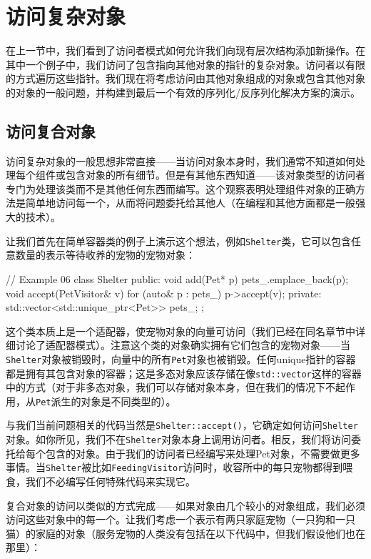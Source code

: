 \section{访问复杂对象}

在上一节中，我们看到了访问者模式如何允许我们向现有层次结构添加新操作。在其中一个例子中，我们访问了包含指向其他对象的指针的复杂对象。访问者以有限的方式遍历这些指针。我们现在将考虑访问由其他对象组成的对象或包含其他对象的对象的一般问题，并构建到最后一个有效的序列化/反序列化解决方案的演示。

\subsection{访问复合对象}

访问复杂对象的一般思想非常直接——当访问对象本身时，我们通常不知道如何处理每个组件或包含对象的所有细节。但是有其他东西知道——该对象类型的访问者专门为处理该类而不是其他任何东西而编写。这个观察表明处理组件对象的正确方法是简单地访问每一个，从而将问题委托给其他人（在编程和其他方面都是一般强大的技术）。

让我们首先在简单容器类的例子上演示这个想法，例如\texttt{Shelter}类，它可以包含任意数量的表示等待收养的宠物的宠物对象：

\begin{code}
// Example 06
class Shelter {
  public:
  void add(Pet* p) {
    pets_.emplace_back(p);
  }
  void accept(PetVisitor& v) {
    for (auto& p : pets_) {
      p->accept(v);
    }
  }
  private:
  std::vector<std::unique_ptr<Pet>> pets_;
};
\end{code}

这个类本质上是一个适配器，使宠物对象的向量可访问（我们已经在同名章节中详细讨论了适配器模式）。注意这个类的对象确实拥有它们包含的宠物对象——当\texttt{Shelter}对象被销毁时，向量中的所有\texttt{Pet}对象也被销毁。任何unique指针的容器都是拥有其包含对象的容器；这是多态对象应该存储在像\texttt{std::vector}这样的容器中的方式（对于非多态对象，我们可以存储对象本身，但在我们的情况下不起作用，从\texttt{Pet}派生的对象是不同类型的）。

与我们当前问题相关的代码当然是\texttt{Shelter::accept()}，它确定如何访问\texttt{Shelter}对象。如你所见，我们不在\texttt{Shelter}对象本身上调用访问者。相反，我们将访问委托给每个包含的对象。由于我们的访问者已经编写来处理Pet对象，不需要做更多事情。当\texttt{Shelter}被比如\texttt{FeedingVisitor}访问时，收容所中的每只宠物都得到喂食，我们不必编写任何特殊代码来实现它。

复合对象的访问以类似的方式完成——如果对象由几个较小的对象组成，我们必须访问这些对象中的每一个。让我们考虑一个表示有两只家庭宠物（一只狗和一只猫）的家庭的对象（服务宠物的人类没有包括在以下代码中，但我们假设他们也在那里）：

